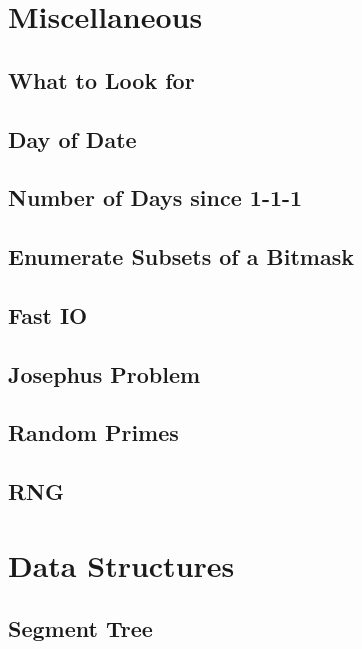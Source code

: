 \section{Miscellaneous}
\subsection{What to Look for}

\subsection{Day of Date}

\subsection{Number of Days since 1-1-1}

\subsection{Enumerate Subsets of a Bitmask}

\subsection{Fast IO}

\subsection{Josephus Problem}

\subsection{Random Primes}

\subsection{RNG}

\section{Data Structures}
\subsection{Segment Tree}

